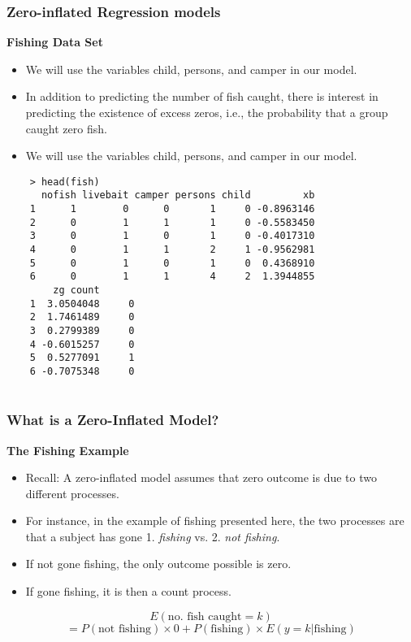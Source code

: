 \documentclass[MASTER.tex]{subfiles}
\begin{document}
\begin{frame}
	\frametitle{Zero-inflated Regression models}
	\textbf{Fishing Data Set}
	\Large
	\begin{itemize}
			\item We will use the variables child, persons, and camper in our model. 
		\item In addition to predicting the number of fish caught, there is interest in predicting the existence of excess zeros, i.e., the probability that a group caught zero fish. 
		\item We will use the variables child, persons, and camper in our model.
	\end{itemize}
\end{frame}

\begin{frame}[fragile]
	\begin{verbatim}
	> head(fish)
	  nofish livebait camper persons child         xb
	1      1        0      0       1     0 -0.8963146
	2      0        1      1       1     0 -0.5583450
	3      0        1      0       1     0 -0.4017310
	4      0        1      1       2     1 -0.9562981
	5      0        1      0       1     0  0.4368910
	6      0        1      1       4     2  1.3944855
	    zg count
	1  3.0504048     0
	2  1.7461489     0
	3  0.2799389     0
	4 -0.6015257     0
	5  0.5277091     1
	6 -0.7075348     0
	
	\end{verbatim}
\end{frame}
\begin{frame}
\frametitle{What is a Zero-Inflated Model?}
\textbf{The Fishing Example}
\begin{itemize}
\item Recall: A zero-inflated model assumes that zero outcome is due to two different processes.

\item For instance, in the example of fishing presented here, the two processes are that a subject has gone 1. \textit{fishing} vs. 2. \textit{not fishing}.
\item If not gone fishing, the only outcome possible is zero. 
\item If gone fishing, it is then a count process. 
\end{itemize}
\begin{framed}
\[E(\mbox{no. fish caught} =k) \]\[=P(\mbox{not fishing})\times 0+P( \mbox{fishing}) \times E(y=k| \mbox{fishing}) \]
\end{framed}
\end{frame}
\end{document}
